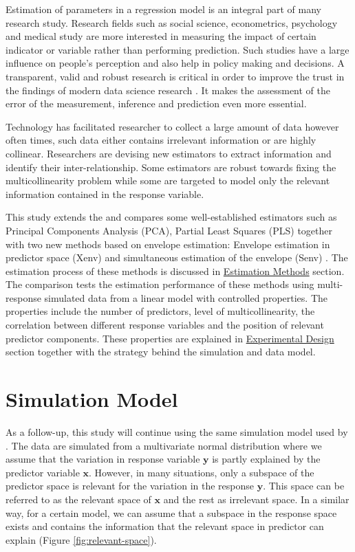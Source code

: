 \documentclass[12pt,3p,authoryear]{elsarticle}
\begin{document}
Estimation of parameters in a regression model is an integral part of many research study. Research fields such as social science, econometrics, psychology and medical study are more interested in measuring the impact of certain indicator or variable rather than performing prediction. Such studies have a large influence on people's perception and also help in policy making and decisions. A transparent, valid and robust research is critical in order to improve the trust in the findings of modern data science research \citep{eu2019auethics}. It makes the assessment of the error of the measurement, inference and prediction even more essential.

Technology has facilitated researcher to collect a large amount of data however often times, such data either contains irrelevant information or are highly collinear. Researchers are devising new estimators to extract information and identify their inter-relationship. Some estimators are robust towards fixing the multicollinearity problem while some are targeted to model only the relevant information contained in the response variable.

This study extends the \citep{rimal2019pred} and compares some well-established estimators such as Principal Components Analysis (PCA), Partial Least Squares (PLS) together with two new methods based on envelope estimation: Envelope estimation in predictor space (Xenv) \citep{cook2010envelope} and simultaneous estimation of the envelope (Senv) \citep{cook2015simultaneous}. The estimation process of these methods is discussed in \protect\hyperlink{estimation-methods}{Estimation Methods} section. The comparison tests the estimation performance of these methods using multi-response simulated data from a linear model with controlled properties. The properties include the number of predictors, level of multicollinearity, the correlation between different response variables and the position of relevant predictor components. These properties are explained in \protect\hyperlink{experimental-design}{Experimental Design} section together with the strategy behind the simulation and data model.

\hypertarget{simulation-model}{%
\section{Simulation Model}\label{simulation-model}}

As a follow-up, this study will continue using the same simulation model used by \citet{rimal2019pred}. The data are simulated from a multivariate normal distribution where we assume that the variation in response variable \(\mathbf{y}\) is partly explained by the predictor variable \(\mathbf{x}\). However, in many situations, only a subspace of the predictor space is relevant for the variation in the response \(\mathbf{y}\). This space can be referred to as the relevant space of \(\mathbf{x}\) and the rest as irrelevant space. In a similar way, for a certain model, we can assume that a subspace in the response space exists and contains the information that the relevant space in predictor can explain (Figure \ref{fig:relevant-space}).
\end{document}
